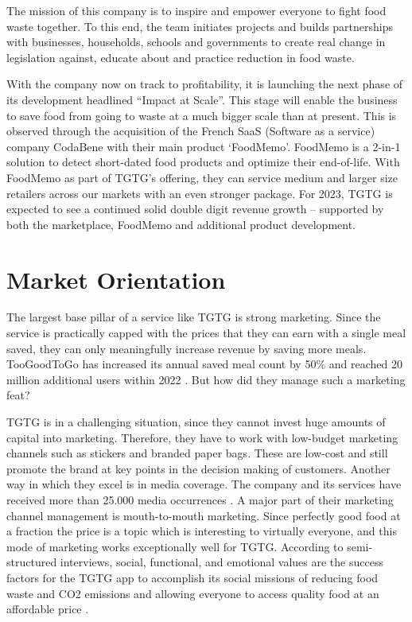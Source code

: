 \documentclass{article}
\begin{document}
The mission of this company is to inspire and empower everyone to fight food
waste together. To this end, the team initiates projects and builds
partnerships with businesses, households, schools and governments to create
real change in legislation against, educate about and practice reduction in
food waste.\cite{impact}

With the company now on track to profitability, it is launching the next phase
of its development headlined “Impact at Scale”. This stage will enable the
business to save food from going to waste at a much bigger scale than at
present. This is observed through the acquisition of the French SaaS (Software
as a service) company CodaBene with their main product ‘FoodMemo’. FoodMemo is
a 2-in-1 solution to detect short-dated food products and optimize their
end-of-life. With FoodMemo as part of TGTG’s offering, they can service medium
and larger size retailers across our markets with an even stronger package. For
2023, TGTG is expected to see a continued solid double digit revenue growth –
supported by both the marketplace, FoodMemo and additional product development.

\section{Market Orientation}

The largest base pillar of a service like TGTG is strong marketing. Since the
service is practically capped with the prices that they can earn with a single
meal saved, they can only meaningfully increase revenue by saving more meals.
TooGoodToGo has increased its annual saved meal count by 50\% and reached 20
million additional users within 2022 \cite{impact}. But how did they manage
such a marketing feat?

TGTG is in a challenging situation, since they cannot invest huge amounts of
capital into marketing. Therefore, they have to work with low-budget marketing
channels such as stickers and branded paper bags. These are low-cost and still
promote the brand at key points in the decision making of customers. Another
way in which they excel is in media coverage. The company and its services
have received more than 25.000 media occurrences \cite{impact}. A major part
of their marketing channel management is mouth-to-mouth marketing. Since
perfectly good food at a fraction the price is a topic which is interesting to
virtually everyone, and this mode of marketing works exceptionally well for
TGTG. According to semi-structured interviews, social, functional, and
emotional values are the success factors for the TGTG app to accomplish its
social missions of reducing food waste and CO2 emissions and allowing everyone
to access quality food at an affordable price \cite{vo-thann}.
\end{document}
